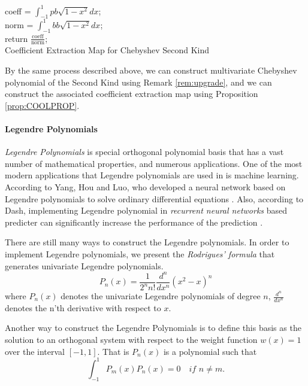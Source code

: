 \documentclass[12pt]{amsart}
\numberwithin{equation}{section}
\theoremstyle{definition}
\numberwithin{thm}{section}
\begin{document}
\begin{algorithm}[H]
     \SetAlgoLined
     coeff = $\int_{-1}^1 pb\sqrt{1-x^2} dx$;\\
     norm = $\int_{-1}^1 bb\sqrt{1-x^2} dx$;\\
     return $\frac{\text{coeff}}{\text{norm}}$;\\
     \caption{Coefficient Extraction Map for Chebyshev Second Kind}
\end{algorithm}

By the same process described above, we can construct multivariate {Chebyshev polynomial of the Second Kind} using Remark \ref{rem:upgrade},
and we can construct the associated {coefficient extraction map} using Proposition \ref{prop:COOLPROP}.

\smallskip

\paragraph{Legendre Polynomials}
\emph{Legendre Polynomials} is special orthogonal polynomial basis that
has a vast number of mathematical properties, and numerous applications.
One of the most modern applications that {Legendre polynomials} are used in
is machine learning. According to Yang, Hou and Luo, who developed a neural
network based on {Legendre polynomials} to solve ordinary differential equations \cite{Yang2018}.
Also, according to Dash, implementing {Legendre polynomial} in \emph{recurrent neural networks} based predicter can
significantly increase the performance of the prediction \cite{DASH20201000}. 

There are still many ways to construct the {Legendre polynomials}. 
In order to implement {Legendre polynomials}, we present the \emph{Rodrigues' formula}
that generates univariate {Legendre polynomials}.
\begin{equation*}
     P_n(x) = \frac{1}{2^n n!} \frac{d^n}{dx^n} (x^2 - x)^n
\end{equation*}
where $P_n(x)$ denotes the univariate {Legendre polynomials} of degree $n$,
$\frac{d^n}{dx^n}$ denotes the n'th derivative with respect to $x$. 

Another way to construct the {Legendre Polynomials} is to define this basis
as the solution to an orthogonal system with respect to the weight function 
$w(x)=1$ over the interval $[-1, 1]$. That is $P_n(x)$ is a polynomial such that
\begin{equation*}
     \int_{-1}^{1} P_m(x) P_n(x) = 0 \quad \textit{if } n \neq m.
\end{equation*}
\end{document}
